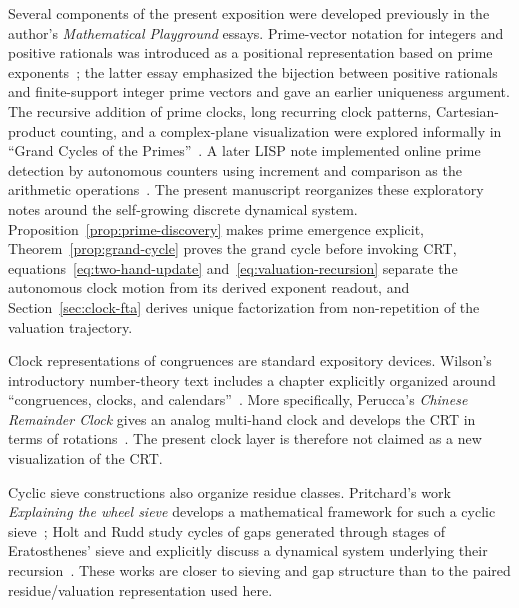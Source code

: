 \documentclass[11pt,a4paper]{article}
\theoremstyle{clockplain}
\theoremstyle{definition}
\theoremstyle{remark}
\begin{document}
Several components of the present exposition were developed previously in the author's \emph{Mathematical Playground} essays.  Prime-vector notation for integers and positive rationals was introduced as a positional representation based on prime exponents~\cite{EmmerichPlaying2024,EmmerichPrimeVectors2025}; the latter essay emphasized the bijection between positive rationals and finite-support integer prime vectors and gave an earlier uniqueness argument.  The recursive addition of prime clocks, long recurring clock patterns, Cartesian-product counting, and a complex-plane visualization were explored informally in ``Grand Cycles of the Primes''~\cite{EmmerichGrandCycles2024}.  A later LISP note implemented online prime detection by autonomous counters using increment and comparison as the arithmetic operations~\cite{EmmerichLisp2025}.  The present manuscript reorganizes these exploratory notes around the self-growing discrete dynamical system. Proposition~\ref{prop:prime-discovery} makes prime emergence explicit, Theorem~\ref{prop:grand-cycle} proves the grand cycle before invoking CRT, equations~\eqref{eq:two-hand-update} and~\eqref{eq:valuation-recursion} separate the autonomous clock motion from its derived exponent readout, and Section~\ref{sec:clock-fta} derives unique factorization from non-repetition of the valuation trajectory.

Clock representations of congruences are standard expository devices. Wilson's introductory number-theory text includes a chapter explicitly organized around ``congruences, clocks, and calendars''~\cite{Wilson2020}. More specifically, Perucca's \emph{Chinese Remainder Clock} gives an analog multi-hand clock and develops the CRT in terms of rotations~\cite{Perucca2017}. The present clock layer is therefore not claimed as a new visualization of the CRT.

Cyclic sieve constructions also organize residue classes. Pritchard's work \emph{Explaining the wheel sieve} develops a mathematical framework for such a cyclic sieve~\cite{Pritchard1982}; Holt and Rudd study cycles of gaps generated through stages of Eratosthenes' sieve and explicitly discuss a dynamical system underlying their recursion~\cite{HoltRudd2014}. These works are closer to sieving and gap structure than to the paired residue/valuation representation used here.
\end{document}
